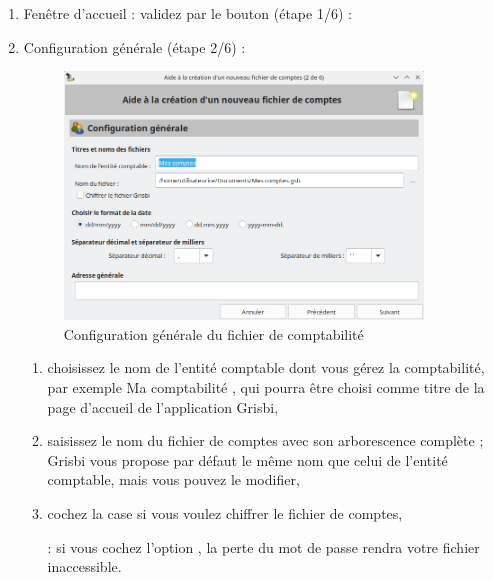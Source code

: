 \begin{enumerate}
	\item Fenêtre d'accueil : validez par le bouton  (étape 1/6) :
	\item Configuration
 générale (étape 2/6)%
 :


		\begin{figure}[htbp]
		\begin{center}
		\includegraphics[width=0.9\textwidth]{image/screenshot/start_file_create}
		\end{center}
		\caption{Configuration générale du fichier de comptabilité}
		\label{start-file-create}
		\end{figure}
		
		\begin{enumerate} 
		 	\item choisissez le nom de l'entité comptable dont vous gérez la comptabilité, par exemple \og Ma comptabilité \fg{}, qui pourra être choisi comme titre de la page d'accueil de l'application Grisbi,
			\item saisissez le nom du fichier de comptes avec son arborescence complète ; Grisbi vous propose par défaut le même nom que celui de l'entité comptable, mais vous pouvez le modifier,
			\item cochez la case  si vous voulez \gls{chiffrer} le fichier de comptes,
			
			\textcolor{red}{}: si vous cochez l'option , la perte du mot de passe rendra votre fichier inaccessible.
			

\end{enumerate}
\end{enumerate}
